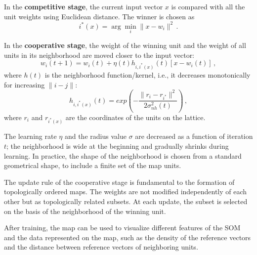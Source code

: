 In the \textbf{competitive stage}, the current input vector $x$ is compared with all the unit weights using Euclidean distance. The winner is chosen as
\begin{equation*}
    i^*(x) = \arg \min_i \|x - w_i\|^2 \,.
\end{equation*}

In the \textbf{cooperative stage}, the weight of the winning unit and the weight of all units in its neighborhood are moved closer to the input vector:
\begin{equation*}
    w_i(t+1) = w_i(t) + \eta (t) h_{i,i^*(x)}(t)[x - w_i(t)] \,,
\end{equation*}
where $h(t)$ is the neighborhood function/kernel, i.e., it decreases monotonically for increasing $\|i-j\|$:
\begin{equation*}
    h_{i,i^*(x)}(t) = exp(-\dfrac{\|r_i - r_{i^*}\|^2}{2 \sigma_{nh}^2 (t)}) \,,
\end{equation*}
where $r_i$ and $r_{i^*(x)}$ are the coordinates of the units on the lattice.

The learning rate $\eta$ and the radius value $\sigma$ are decreased as a function of iteration $t$; the neighborhood is wide at the beginning and gradually shrinks during learning. In practice, the shape of the neighborhood is chosen from a standard geometrical shape, to include a finite set of the map units.

The update rule of the cooperative stage is fundamental to the formation of topologically ordered maps. The weights are not modified independently of each other but as topologically related subsets. At each update, the subset is selected on the basis of the neighborhood of the winning unit.

After training, the map can be used to visualize different features of the SOM and the data represented on the map, such as the density of the reference vectors and the distance between reference vectors of neighboring units.